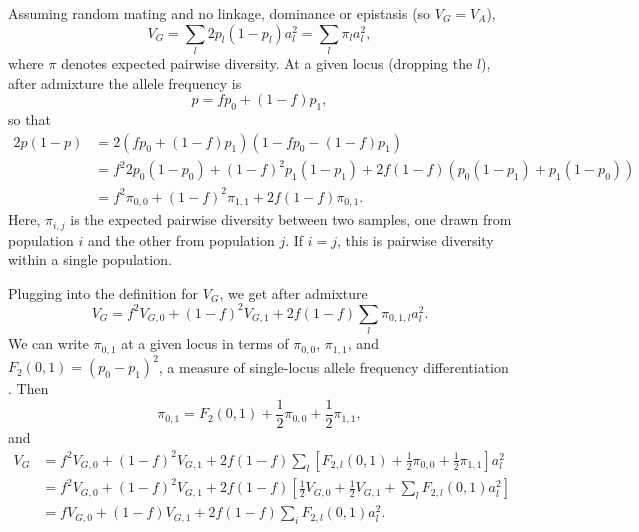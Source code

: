 \documentclass{article}
\begin{document}
Assuming random mating and no linkage, dominance or epistasis (so \(V_G=V_A\)),
\[V_G = \sum_l 2p_l(1-p_l)a_l^2 = \sum_l \pi_l a_l^2,\]
where $\pi$ denotes expected pairwise diversity.
At a given locus (dropping the $l$), after admixture the allele frequency is
\[p=f p_0 + (1-f) p_1,\]
so that
\begin{align*}
    2p(1-p) & = 2(f p_0 + (1-f) p_1)(1 - f p_0 - (1-f) p_1) \\
    & = f^2 2p_0(1-p_0) + (1-f)^2 p_1(1-p_1) + 2f(1-f) (p_0(1-p_1) + p_1(1-p_0)) \\
    & = f^2 \pi_{0,0} + (1-f)^2 \pi_{1,1} + 2f(1-f)\pi_{0,1}.
\end{align*}
Here, $\pi_{i,j}$ is the expected pairwise diversity between two samples, one
drawn from population $i$ and the other from population $j$. If $i=j$, this is
pairwise diversity within a single population.

Plugging into the definition for $V_G$, we get after admixture
\[V_G = f^2 V_{G,0} + (1-f)^2 V_{G,1} + 2f(1-f)\sum_l \pi_{0,1,l}a_l^2.\]
We can write $\pi_{0,1}$ at a given locus in terms of $\pi_{0,0}$, $\pi_{1,1}$,
and $F_2(0,1)=(p_0-p_1)^2$, a measure of single-locus allele frequency
differentiation \citep{peter2016admixture}. Then
\[\pi_{0,1} = F_2(0,1) + \frac{1}{2}\pi_{0,0} + \frac{1}{2}\pi_{1,1},\]
and
\begin{align*}
    V_G & = f^2 V_{G,0} + (1-f)^2 V_{G,1} + 2f(1-f)\sum_l \left[F_{2,l}(0,1)
    + \frac{1}{2}\pi_{0,0} + \frac{1}{2}\pi_{1,1}\right] a_l^2 \\
    & = f^2 V_{G,0} + (1-f)^2 V_{G,1} + 2f(1-f)\left[\frac{1}{2}V_{G,0} 
    + \frac{1}{2}V_{G,1} + \sum_l F_{2,l}(0,1)a_l^2\right] \\
    & = f V_{G,0} + (1-f)V_{G,1} + 2f(1-f)\sum_i F_{2,l}(0,1)a_l^2.
\end{align*}
\end{document}
